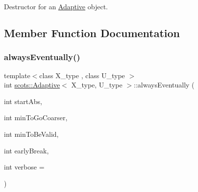 Destructor for an \hyperlink{classscots_1_1Adaptive}{Adaptive} object. 

\subsection{Member Function Documentation}
\mbox{\label{classscots_1_1Adaptive_aaf645bf4507f575426dfdd29de47dfe2}} 
\subsubsection{\texorpdfstring{always\+Eventually()}{alwaysEventually()}}
{\footnotesize\ttfamily template$<$class X\+\_\+type , class U\+\_\+type $>$ \\
int \hyperlink{classscots_1_1Adaptive}{scots\+::\+Adaptive}$<$ X\+\_\+type, U\+\_\+type $>$\+::always\+Eventually (\begin{DoxyParamCaption}\item[{int}]{start\+Abs,  }\item[{int}]{min\+To\+Go\+Coarser,  }\item[{int}]{min\+To\+Be\+Valid,  }\item[{int}]{early\+Break,  }\item[{int}]{verbose = {} }\end{DoxyParamCaption})\hspace{0.3cm}{\ttfamily [inline]}}

